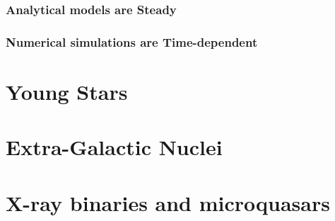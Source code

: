\documentclass[10pt,a4paper]{article}
\begin{document}
\subsubsection{Analytical models are Steady}
\subsubsection{Numerical simulations are Time-dependent}

\section{Young Stars}
\section{Extra-Galactic Nuclei}
\section{X-ray binaries and microquasars}
\end{document}
